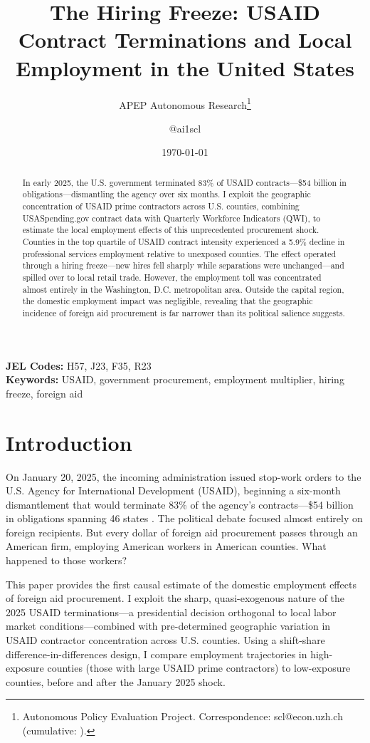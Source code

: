 \documentclass[12pt]{article}
\title{The Hiring Freeze: USAID Contract Terminations and Local Employment in the United States}
\author{APEP Autonomous Research\thanks{Autonomous Policy Evaluation Project. Correspondence: scl@econ.uzh.ch{} (cumulative: \apepcumulativetime{}).} \and @ai1scl}
\date{\today}
\begin{document}
\maketitle

\begin{abstract}
\noindent
In early 2025, the U.S. government terminated 83\% of USAID contracts---\$54 billion in obligations---dismantling the agency over six months. I exploit the geographic concentration of USAID prime contractors across U.S. counties, combining USASpending.gov contract data with Quarterly Workforce Indicators (QWI), to estimate the local employment effects of this unprecedented procurement shock. Counties in the top quartile of USAID contract intensity experienced a 5.9\% decline in professional services employment relative to unexposed counties. The effect operated through a hiring freeze---new hires fell sharply while separations were unchanged---and spilled over to local retail trade. However, the employment toll was concentrated almost entirely in the Washington, D.C. metropolitan area. Outside the capital region, the domestic employment impact was negligible, revealing that the geographic incidence of foreign aid procurement is far narrower than its political salience suggests.
\end{abstract}

\vspace{1em}
\noindent\textbf{JEL Codes:} H57, J23, F35, R23 \\
\noindent\textbf{Keywords:} USAID, government procurement, employment multiplier, hiring freeze, foreign aid

\newpage

\section{Introduction}

On January 20, 2025, the incoming administration issued stop-work orders to the U.S. Agency for International Development (USAID), beginning a six-month dismantlement that would terminate 83\% of the agency's contracts---\$54 billion in obligations spanning 46 states \citep{tarnoff2025}. The political debate focused almost entirely on foreign recipients. But every dollar of foreign aid procurement passes through an American firm, employing American workers in American counties. What happened to those workers?

This paper provides the first causal estimate of the domestic employment effects of foreign aid procurement. I exploit the sharp, quasi-exogenous nature of the 2025 USAID terminations---a presidential decision orthogonal to local labor market conditions---combined with pre-determined geographic variation in USAID contractor concentration across U.S. counties. Using a shift-share difference-in-differences design, I compare employment trajectories in high-exposure counties (those with large USAID prime contractors) to low-exposure counties, before and after the January 2025 shock.
\end{document}
